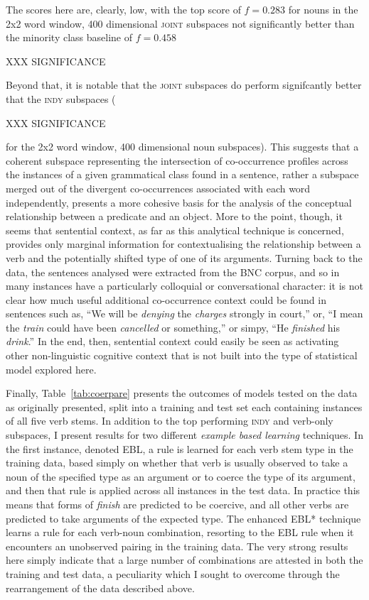 The scores here are, clearly, low, with the top score of $f = 0.283$ for nouns in the 2x2 word window, 400 dimensional \textsc{joint} subspaces not significantly better than the minority class baseline of $f = 0.458$

XXX SIGNIFICANCE

Beyond that, it is notable that the \textsc{joint} subspaces do perform signifcantly better that the \textsc{indy} subspaces (

XXX SIGNIFICANCE

for the 2x2 word window, 400 dimensional noun subspaces).  This suggests that a coherent subspace representing the intersection of co-occurrence profiles across the instances of a given grammatical class found in a sentence, rather a subspace merged out of the divergent co-occurrences associated with each word independently, presents a more cohesive basis for the analysis of the conceptual relationship between a predicate and an object.  More to the point, though, it seems that sentential context, as far as this analytical technique is concerned, provides only marginal information for contextualising the relationship between a verb and the potentially shifted type of one of its arguments.  Turning back to the data, the sentences analysed were extracted from the BNC corpus, and so in many instances have a particularly colloquial or conversational character: it is not clear how much useful additional co-occurrence context could be found in sentences such as, ``We will be \emph{denying} the \emph{charges} strongly in court,'' or, ``I mean the \emph{train} could have been \emph{cancelled} or something,'' or simpy, ``He \emph{finished} his \emph{drink}.''  In the end, then, sentential context could easily be seen as activating other non-linguistic cognitive context that is not built into the type of statistical model explored here.

Finally, Table~\ref{tab:coerpare} presents the outcomes of models tested on the data as originally presented, split into a training and test set each containing instances of all five verb stems.  In addition to the top performing \textsc{indy} and verb-only subspaces, I present results for two different \emph{example based learning} techniques.  In the first instance, denoted \textsc{EBL}, a rule is learned for each verb stem type in the training data, based simply on whether that verb is usually observed to take a noun of the specified type as an argument or to coerce the type of its argument, and then that rule is applied across all instances in the test data.  In practice this means that forms of \emph{finish} are predicted to be coercive, and all other verbs are predicted to take arguments of the expected type.  The enhanced \textsc{EBL*} technique learns a rule for each verb-noun combination, resorting to the \textsc{EBL} rule when it encounters an unobserved pairing in the training data.  The very strong results here simply indicate that a large number of combinations are attested in both the training and test data, a peculiarity which I sought to overcome through the rearrangement of the data described above.

